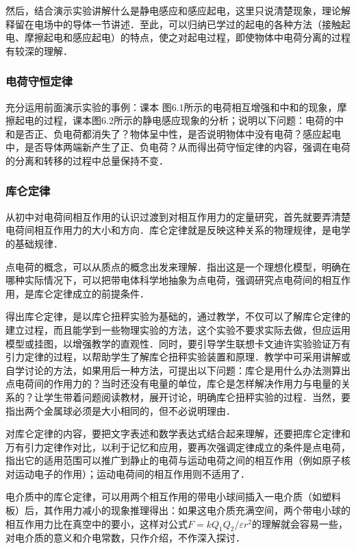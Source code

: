 然后，结合演示实验讲解什么是静电感应和感应起电，这里只说清楚现象，理论解释留在电场中的导体一节讲述．至此，可以归纳已学过的起电的各种方法（接触起电、摩擦起电和感应起电）的特点，使之对起电过程，即使物体中电荷分离的过程有较深的理解．

\subsubsection{电荷守恒定律}

充分运用前面演示实验的事例：课本
图6.1所示的电荷相互增强和中和的现象，摩擦起电的过程，课本图6.2所示的静电感应现象的分析；说明以下问题：电荷的中和是否正、负电荷都消失了？物体呈中性，是否说明物体中没有电荷？感应起电中，是否导体两端新产生了正、负电荷？从而得出荷守恒定律的内容，强调在电荷的分离和转移的过程中总量保持不变．

\subsubsection{库仑定律}

从初中对电荷间相互作用的认识过渡到对相互作用力的定量研究，首先就要弄清楚电荷间相互作用力的大小和方向．库仑定律就是反映这种关系的物理规律，是电学的基础规律．

点电荷的概念，可以从质点的概念出发来理解．指出这是一个理想化模型，明确在哪种实际情况下，可以把带电体科学地抽象为点电荷，强调研究点电荷间的相互作用，是库仑定律成立的前提条件．

得出库仑定律，是以库仑扭秤实验为基础的，通过教学，不仅可以了解库仑定律的建立过程，而且能学到一些物理实验的方法，这个实验不要求实际去做，但应运用模型或挂图，以增强教学的直观性．同时，要引导学生联想卡文迪许实验验证万有引力定律的过程，以帮助学生了解库仑扭秤实验装置和原理．教学中可采用讲解或自学讨论的方法，如果用后一种方法，可提出以下问题：库仑是用什么办法测算出点电荷间的作用力的？当时还没有电量的单位，库仑是怎样解决作用力与电量的关系的？让学生带着问题阅读教材，展开讨论，明确库仑扭秤实验的过程．当然，要指出两个金属球必须是大小相同的，但不必说明理由．

对库仑定律的内容，要把文字表述和数学表达式结合起来理解，还要把库仑定律和万有引力定律作对比，以利于记忆和应用，要再次强调定律成立的条件是点电荷，指出它的适用范围可以推广到静止的电荷与运动电荷之间的相互作用（例如原子核对运动电子的作用）；运动电荷间的相互作用则不适用了．

电介质中的库仑定律，可以用两个相互作用的带电小球间插入一电介质（如塑料板）后，其作用力减小的现象推理得出：如果这电介质充满空间，两个带电小球的相互作用力比在真空中的要小，这样对公式$F=kQ_1Q_2/\varepsilon r^2$的理解就会容易一些，对电介质的意义和介电常数，只作介绍，不作深入探讨．

